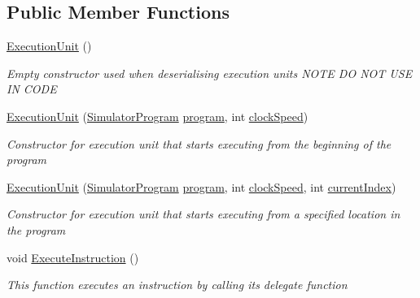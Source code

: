 \subsection*{Public Member Functions}
\begin{DoxyCompactItemize}
\item 
\hyperlink{class_c_p_u___o_s___simulator_1_1_c_p_u_1_1_execution_unit_a120752194e87fb29721e46176b912a0c}{Execution\+Unit} ()
\begin{DoxyCompactList}\small\item\em Empty constructor used when deserialising execution units N\+O\+T\+E D\+O N\+O\+T U\+S\+E I\+N C\+O\+D\+E \end{DoxyCompactList}\item 
\hyperlink{class_c_p_u___o_s___simulator_1_1_c_p_u_1_1_execution_unit_aaa72bccee27d810d5bbfa9ed02215fa9}{Execution\+Unit} (\hyperlink{class_c_p_u___o_s___simulator_1_1_c_p_u_1_1_simulator_program}{Simulator\+Program} \hyperlink{class_c_p_u___o_s___simulator_1_1_c_p_u_1_1_execution_unit_a192670bee8ca089c38e9989350f658d6}{program}, int \hyperlink{class_c_p_u___o_s___simulator_1_1_c_p_u_1_1_execution_unit_a0deb0a3e0c9fa402598bbf18be6535cc}{clock\+Speed})
\begin{DoxyCompactList}\small\item\em Constructor for execution unit that starts executing from the beginning of the program \end{DoxyCompactList}\item 
\hyperlink{class_c_p_u___o_s___simulator_1_1_c_p_u_1_1_execution_unit_a0b69abfef40692e266fee90b2321797e}{Execution\+Unit} (\hyperlink{class_c_p_u___o_s___simulator_1_1_c_p_u_1_1_simulator_program}{Simulator\+Program} \hyperlink{class_c_p_u___o_s___simulator_1_1_c_p_u_1_1_execution_unit_a192670bee8ca089c38e9989350f658d6}{program}, int \hyperlink{class_c_p_u___o_s___simulator_1_1_c_p_u_1_1_execution_unit_a0deb0a3e0c9fa402598bbf18be6535cc}{clock\+Speed}, int \hyperlink{class_c_p_u___o_s___simulator_1_1_c_p_u_1_1_execution_unit_af6807cb5343acc2c40a08166c748f1f0}{current\+Index})
\begin{DoxyCompactList}\small\item\em Constructor for execution unit that starts executing from a specified location in the program \end{DoxyCompactList}\item 
void \hyperlink{class_c_p_u___o_s___simulator_1_1_c_p_u_1_1_execution_unit_ae0298423e5e7aad47e342e3960a361ac}{Execute\+Instruction} ()
\begin{DoxyCompactList}\small\item\em This function executes an instruction by calling its delegate function \end{DoxyCompactList}\end{DoxyCompactItemize}
